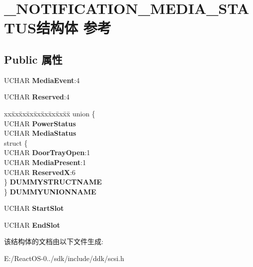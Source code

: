 \hypertarget{struct___n_o_t_i_f_i_c_a_t_i_o_n___m_e_d_i_a___s_t_a_t_u_s}{}\section{\+\_\+\+N\+O\+T\+I\+F\+I\+C\+A\+T\+I\+O\+N\+\_\+\+M\+E\+D\+I\+A\+\_\+\+S\+T\+A\+T\+U\+S结构体 参考}
\label{struct___n_o_t_i_f_i_c_a_t_i_o_n___m_e_d_i_a___s_t_a_t_u_s}
\subsection*{Public 属性}
\begin{DoxyCompactItemize}
\item 
\mbox{\label{struct___n_o_t_i_f_i_c_a_t_i_o_n___m_e_d_i_a___s_t_a_t_u_s_a0cb1490fbafbf9c8674c773097b2bd3d}} 
U\+C\+H\+AR {\bfseries Media\+Event}\+:4
\item 
\mbox{\label{struct___n_o_t_i_f_i_c_a_t_i_o_n___m_e_d_i_a___s_t_a_t_u_s_a855f43f6d3935fc6d014eb12e7a8b84a}} 
U\+C\+H\+AR {\bfseries Reserved}\+:4
\item 
\mbox{\label{struct___n_o_t_i_f_i_c_a_t_i_o_n___m_e_d_i_a___s_t_a_t_u_s_a8e52225e22eb6a95c8b026d92a433a6a}} 
\begin{tabbing}
xx\=xx\=xx\=xx\=xx\=xx\=xx\=xx\=xx\=\kill
union \{\\
\>UCHAR {\bfseries PowerStatus}\\
\>UCHAR {\bfseries MediaStatus}\\
\>struct \{\\
\>\>UCHAR {\bfseries DoorTrayOpen}:1\\
\>\>UCHAR {\bfseries MediaPresent}:1\\
\>\>UCHAR {\bfseries ReservedX}:6\\
\>\} {\bfseries DUMMYSTRUCTNAME}\\
\} {\bfseries DUMMYUNIONNAME}\\

\end{tabbing}\item 
\mbox{\label{struct___n_o_t_i_f_i_c_a_t_i_o_n___m_e_d_i_a___s_t_a_t_u_s_afe674ef8e25b946af63854e7b71144d9}} 
U\+C\+H\+AR {\bfseries Start\+Slot}
\item 
\mbox{\label{struct___n_o_t_i_f_i_c_a_t_i_o_n___m_e_d_i_a___s_t_a_t_u_s_aed6afe2c8992cb9151f9aab07acec27c}} 
U\+C\+H\+AR {\bfseries End\+Slot}
\end{DoxyCompactItemize}


该结构体的文档由以下文件生成\+:\begin{DoxyCompactItemize}
\item 
E\+:/\+React\+O\+S-\/0../sdk/include/ddk/scsi.\+h\end{DoxyCompactItemize}
